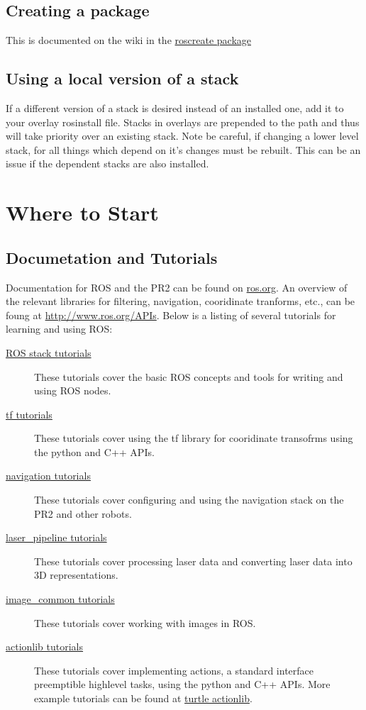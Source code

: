 \subsection{Creating a package}
This is documented on the wiki in the
\href{http://www.ros.org/wiki/roscreate}{roscreate package}

\subsection{Using a local version of a stack}
If a different version of a stack is desired instead of an installed
one, add it to your overlay rosinstall file.  Stacks in overlays are
prepended to the path and thus will take priority over an existing
stack.  Note be careful, if changing a lower level stack, for all
things which depend on it's changes must be rebuilt. This can be an
issue if the dependent stacks are also installed.

\section{Where to Start}
\subsection{Documetation and Tutorials}
Documentation for ROS and the PR2 can be found on \href{http://www.ros.org}{ros.org}. An overview 
of the relevant libraries for filtering, navigation, cooridinate tranforms, etc., can be foung at 
\href{http://www.ros.org/APIs}{http://www.ros.org/APIs}. Below is a listing of several tutorials 
for learning and using ROS:
\begin{description}
\item[\href{http://www.ros.org/wiki/ROS/Tutorials}{ROS stack tutorials}] These tutorials cover the
basic ROS concepts and tools for writing and using ROS nodes.
\item[\href{http://www.ros.org/wiki/tf/Tutorials}{tf tutorials}] These tutorials cover using the tf 
library for cooridinate transofrms using the python and C++ APIs.
\item[\href{http://www.ros.org/wiki/navigation/Tutorials}{navigation tutorials}] These tutorials 
cover configuring and using the navigation stack on the PR2 and other robots.
\item[\href{http://www.ros.org/wiki/laser\_pipeline/Tutorials}{laser\_pipeline tutorials}] These tutorials 
cover processing laser data and converting laser data into 3D representations.
\item[\href{http://www.ros.org/wiki/image\_common/Tutorials}{image\_common tutorials}] These tutorials 
cover working with images in ROS.
\item[\href{http://www.ros.org/wiki/actionlib\_tutorials/Tutorials}{actionlib tutorials}] These 
tutorials cover implementing actions, a standard interface preemptible highlevel tasks, using 
the python and C++ APIs. More example tutorials can be found at 
\href{http://www.ros.org/wiki/turtle\_actionlib}{turtle actionlib}.
\end{description}

